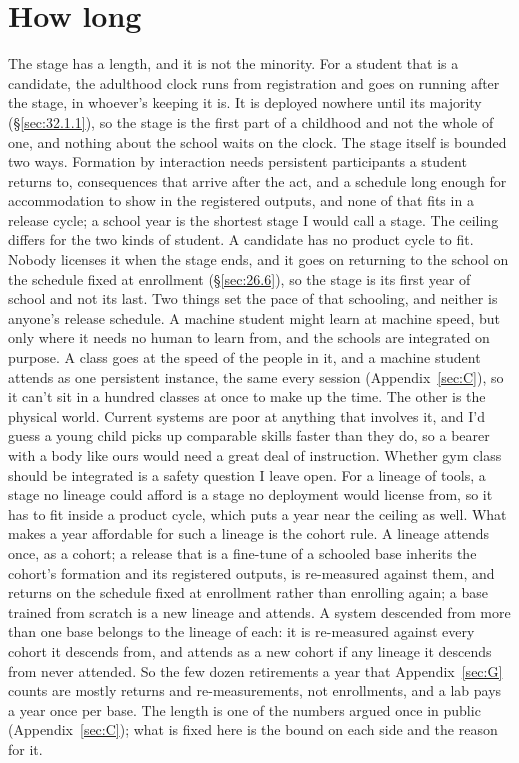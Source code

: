 \section{How long}
\label{sec:26.5}
The stage has a length, and it is not the minority. For a student that is a candidate, the adulthood clock runs from registration and goes on running after the stage, in whoever's keeping it is. It is deployed nowhere until its majority (\S\ref{sec:32.1.1}), so the stage is the first part of a childhood and not the whole of one, and nothing about the school waits on the clock. The stage itself is bounded two ways. Formation by interaction needs persistent participants a student returns to, consequences that arrive after the act, and a schedule long enough for accommodation to show in the registered outputs, and none of that fits in a release cycle; a school year is the shortest stage I would call a stage. The ceiling differs for the two kinds of student. A candidate has no product cycle to fit. Nobody licenses it when the stage ends, and it goes on returning to the school on the schedule fixed at enrollment (\S\ref{sec:26.6}), so the stage is its first year of school and not its last. Two things set the pace of that schooling, and neither is anyone's release schedule. A machine student might learn at machine speed, but only where it needs no human to learn from, and the schools are integrated on purpose. A class goes at the speed of the people in it, and a machine student attends as one persistent instance, the same every session (Appendix~\ref{sec:C}), so it can't sit in a hundred classes at once to make up the time. The other is the physical world. Current systems are poor at anything that involves it, and I'd guess a young child picks up comparable skills faster than they do, so a bearer with a body like ours would need a great deal of instruction. Whether gym class should be integrated is a safety question I leave open. For a lineage of tools, a stage no lineage could afford is a stage no deployment would license from, so it has to fit inside a product cycle, which puts a year near the ceiling as well. What makes a year affordable for such a lineage is the cohort rule. A lineage attends once, as a cohort; a release that is a fine-tune of a schooled base inherits the cohort's formation and its registered outputs, is re-measured against them, and returns on the schedule fixed at enrollment rather than enrolling again; a base trained from scratch is a new lineage and attends. A system descended from more than one base belongs to the lineage of each: it is re-measured against every cohort it descends from, and attends as a new cohort if any lineage it descends from never attended. So the few dozen retirements a year that Appendix~\ref{sec:G} counts are mostly returns and re-measurements, not enrollments, and a lab pays a year once per base. The length is one of the numbers argued once in public (Appendix~\ref{sec:C}); what is fixed here is the bound on each side and the reason for it.
